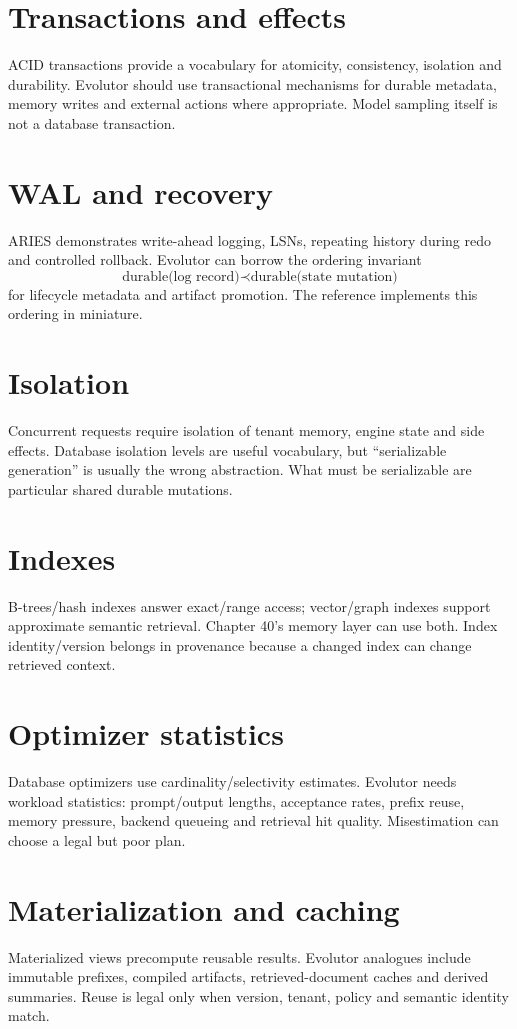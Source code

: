 \section{Transactions and effects}
ACID transactions provide a vocabulary for atomicity, consistency, isolation and durability. Evolutor should use transactional mechanisms for durable metadata, memory writes and external actions where appropriate. Model sampling itself is not a database transaction.

\section{WAL and recovery}
ARIES demonstrates write-ahead logging, LSNs, repeating history during redo and controlled rollback. Evolutor can borrow the ordering invariant
\[
\text{durable(log record)} \prec \text{durable(state mutation)}
\]
for lifecycle metadata and artifact promotion. The reference implements this ordering in miniature.

\section{Isolation}
Concurrent requests require isolation of tenant memory, engine state and side effects. Database isolation levels are useful vocabulary, but ``serializable generation'' is usually the wrong abstraction. What must be serializable are particular shared durable mutations.

\section{Indexes}
B-trees/hash indexes answer exact/range access; vector/graph indexes support approximate semantic retrieval. Chapter 40's memory layer can use both. Index identity/version belongs in provenance because a changed index can change retrieved context.

\section{Optimizer statistics}
Database optimizers use cardinality/selectivity estimates. Evolutor needs workload statistics: prompt/output lengths, acceptance rates, prefix reuse, memory pressure, backend queueing and retrieval hit quality. Misestimation can choose a legal but poor plan.

\section{Materialization and caching}
Materialized views precompute reusable results. Evolutor analogues include immutable prefixes, compiled artifacts, retrieved-document caches and derived summaries. Reuse is legal only when version, tenant, policy and semantic identity match.


